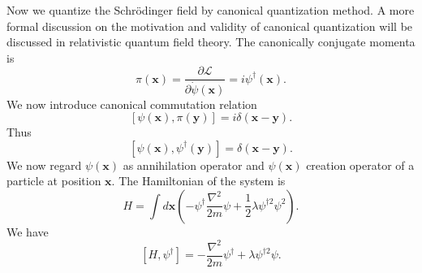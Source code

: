 Now we quantize the Schr\"{o}dinger field by canonical quantization method. A more formal discussion on the motivation and validity of canonical quantization will be discussed in relativistic quantum field theory.
The canonically conjugate momenta is
\[\pi(\bm{x}) = \frac{\partial \mathcal{L}}{\partial \dot{\psi}(\bm{x})} = i\psi^{\dagger}(\bm{x}).\] 
We now introduce canonical commutation relation
\[[\psi(\bm{x}),\pi(\bm{y})] = i\delta(\bm{x}-\bm{y}).\]
Thus
\[[\psi(\bm{x}),\psi^{\dagger}(\bm{y})] = \delta(\bm{x}-\bm{y}).\]
We now regard $\psi(\bm{x})$ as annihilation operator and $\psi(\bm{x})$ creation operator of a particle at position $\bm{x}$.
The Hamiltonian of the system is
\[H = \int d\bm{x} \left( -\psi^{\dagger}\frac{\nabla^2}{2m}\psi + \frac{1}{2}\lambda\psi^{\dagger 2}\psi^2 \right).\]
We have
\[[H,\psi^{\dagger}] = -\frac{\nabla^2}{2m}\psi^{\dagger} + \lambda \psi^{\dagger 2}\psi.\]

